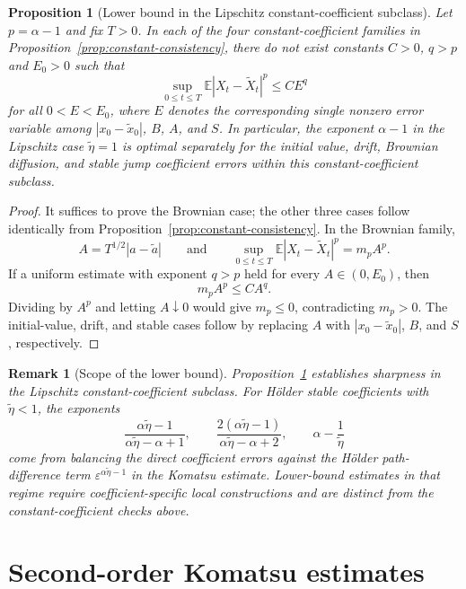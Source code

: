 \documentclass[11pt]{article}
\newtheorem{proposition}[theorem]{Proposition}
\newtheorem{remark}[theorem]{Remark}
\newcommand{\E}{\mathbb{E}}
\newcommand{\1}{\mathbf{1}}
\newcommand{\wt}{\tilde}
\newcommand{\eps}{\varepsilon}
\begin{document}
\begin{proposition}[Lower bound in the Lipschitz constant-coefficient subclass]
\label{prop:constant-sharpness}
Let $p=\alpha-1$ and fix $T>0$. In each of the four constant-coefficient families in Proposition~\ref{prop:constant-consistency}, there do not exist constants $C>0$, $q>p$ and $E_0>0$ such that
\[
  \sup_{0\le t\le T}\E|X_t-\wt X_t|^p\le C E^q
\]
for all $0<E<E_0$, where $E$ denotes the corresponding single nonzero error variable among $|x_0-\wt x_0|$, $B$, $A$, and $S$. In particular, the exponent $\alpha-1$ in the Lipschitz case $\wt\eta=1$ is optimal separately for the initial value, drift, Brownian diffusion, and stable jump coefficient errors within this constant-coefficient subclass.
\end{proposition}

\begin{proof}
It suffices to prove the Brownian case; the other three cases follow identically from Proposition~\ref{prop:constant-consistency}. In the Brownian family,
\[
  A=T^{1/2}|a-\wt a|
  \qquad\text{and}\qquad
  \sup_{0\le t\le T}\E|X_t-\wt X_t|^p=m_pA^p.
\]
If a uniform estimate with exponent $q>p$ held for every $A\in(0,E_0)$, then
\[
  m_pA^p\le CA^q.
\]
Dividing by $A^p$ and letting $A\downarrow0$ would give $m_p\le0$, contradicting $m_p>0$. The initial-value, drift, and stable cases follow by replacing $A$ with $|x_0-\wt x_0|$, $B$, and $S$, respectively.
\end{proof}

\begin{remark}[Scope of the lower bound]
Proposition~\ref{prop:constant-sharpness} establishes sharpness in the Lipschitz constant-coefficient subclass. For H\"older stable coefficients with $\wt\eta<1$, the exponents
\[
\frac{\alpha\wt\eta-1}{\alpha\wt\eta-\alpha+1},
\qquad
\frac{2(\alpha\wt\eta-1)}{\alpha\wt\eta-\alpha+2},
\qquad
\alpha-\frac1{\wt\eta}
\]
come from balancing the direct coefficient errors against the H\"older path-difference term $\eps^{\alpha\wt\eta-1}$ in the Komatsu estimate. Lower-bound estimates in that regime require coefficient-specific local constructions and are distinct from the constant-coefficient checks above.
\end{remark}

\section{Second-order Komatsu estimates}
\label{sec:auxiliary}
\end{document}
